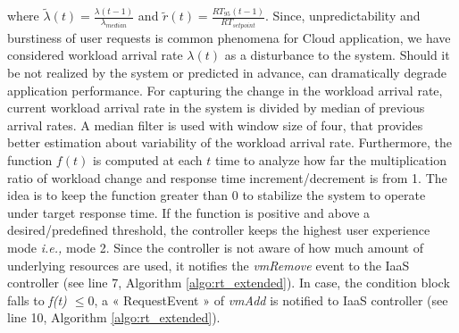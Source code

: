 where \begin{math}\tilde{\lambda}(t) = \frac {\lambda(t-1)}
	{\lambda_{median}}\end{math} and \begin{math}\tilde{r}(t) =\frac
	{RT_{95}(t-1)} {RT_{setpoint}}\end{math}. Since,
unpredictability and burstiness of user requests is common phenomena for Cloud application, we have considered workload arrival rate $\lambda(t)$ as a disturbance to the system. Should it be not realized by the system or predicted in advance, can dramatically degrade
application performance. For capturing the change in the workload
arrival rate, current workload arrival rate in the system is divided by median of
previous arrival rates. A median filter is used with window size of four, that provides better estimation about variability of the workload arrival rate. 
Furthermore, the function $f(t)$ is computed at each $t$ time to analyze how far the multiplication ratio of workload change and response time increment/decrement is from 1. The idea is to keep the function greater than $0$ to stabilize
the system to operate under target response time. If the function is positive and above a desired/predefined threshold, the controller keeps the highest user experience mode \emph{i.e.,} mode 2. Since the controller is not aware of how much amount of underlying resources are used, it notifies the \emph{vmRemove} event to the IaaS controller (see line 7, Algorithm \ref{algo:rt_extended}). In case, the condition block falls to \emph{f(t) $\leq 0$}, a « RequestEvent » of \emph{vmAdd} is notified to IaaS controller (see line 10, Algorithm \ref{algo:rt_extended}).





